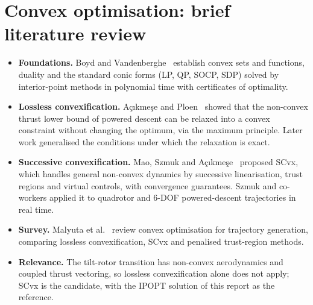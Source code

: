 \documentclass[11pt,a4paper]{article}
\begin{document}
\section{Convex optimisation: brief literature review}\label{app:convex}
\begin{itemize}
  \item \textbf{Foundations.} Boyd and Vandenberghe~\cite{boyd2004} establish convex sets and functions,
        duality and the standard conic forms (LP, QP, SOCP, SDP) solved by interior-point methods in
        polynomial time with certificates of optimality.
  \item \textbf{Lossless convexification.} Açıkmeşe and Ploen~\cite{acikmese2007} showed that the
        non-convex thrust lower bound of powered descent can be relaxed into a convex constraint without
        changing the optimum, via the maximum principle. Later work generalised the conditions under which
        the relaxation is exact.
  \item \textbf{Successive convexification.} Mao, Szmuk and Açıkmeşe~\cite{mao2016} proposed SCvx, which
        handles general non-convex dynamics by successive linearisation, trust regions and virtual controls,
        with convergence guarantees. Szmuk and co-workers applied it to quadrotor and 6-DOF powered-descent
        trajectories in real time.
  \item \textbf{Survey.} Malyuta et al.~\cite{malyuta2022} review convex optimisation for trajectory
        generation, comparing lossless convexification, SCvx and penalised trust-region methods.
  \item \textbf{Relevance.} The tilt-rotor transition has non-convex aerodynamics and coupled thrust
        vectoring, so lossless convexification alone does not apply; SCvx is the candidate, with the
        IPOPT solution of this report as the reference.
\end{itemize}
\end{document}
